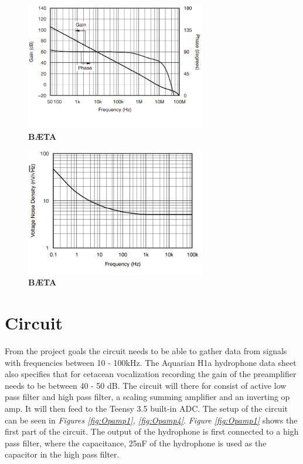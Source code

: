 \begin{figure}[h]
    \centering
    \includegraphics[width=0.7\textwidth]{graphics/dbVsfreq.png}
    \caption{\textbf{BÆTA}}
    \label{fig:AVhighpass}
\end{figure}

\begin{figure}[h]
    \centering
    \includegraphics[width=0.7\textwidth]{graphics/noiseDensvsFreq.png}
    \caption{\textbf{BÆTA}}
    \label{fig:AVhighpass}
\end{figure}

\section{Circuit}

From the project goals the circuit needs to be able to gather data from signals with frequencies between 10 - 100kHz. 
The Aquarian H1a hydrophone data sheet also specifies that for cetacean vocalization recording the gain of the preamplifier needs to be between 40 - 50 dB.
The circuit will there for consist of active low pass filter and high pass filter, a scaling summing amplifier and an inverting op amp.
It will then feed to the Teensy 3.5 built-in ADC.
The setup of the circuit can be seen in \textit{Figures \ref{fig:Opamp1}, \ref{fig:Opamp4}}.
\textit{Figure \ref{fig:Opamp1}} shows the first part of the circuit.
The output of the hydrophone is first connected to a high pass filter, where the capacitance, 25nF of the hydrophone is used as the capacitor in the high pass filter.

